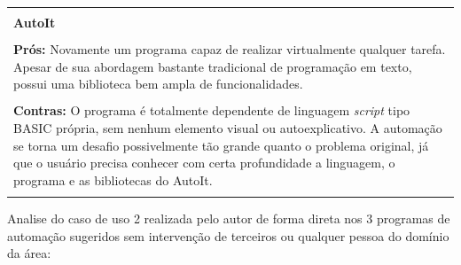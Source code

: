\documentclass[tg]{mdtufsm}
\begin{document}
{                    \begin{tabular}{ | m{15.6cm} | }
                		\hline \\
                		{\bf AutoIt} \\ \\
                		{\bf Prós:}
                            Novamente um programa capaz de realizar virtualmente qualquer tarefa. Apesar de sua abordagem bastante tradicional de programação em texto, possui uma biblioteca bem ampla de funcionalidades.\\ \\
                		{\bf Contras:}
                            O programa é totalmente dependente de linguagem \emph{script} tipo BASIC própria, sem nenhum elemento visual ou autoexplicativo. A automação se torna um desafio possivelmente tão grande quanto o problema original, já que o usuário precisa conhecer com certa profundidade a linguagem, o programa e as bibliotecas do AutoIt. \\ \\                		\hline
        	       \end{tabular}
                }

            	\bigskip
            	Analise do caso de uso 2 realizada pelo autor de forma direta nos 3 programas de automação sugeridos sem intervenção de terceiros ou qualquer pessoa do domínio da área:
            	\bigskip
\end{document}

